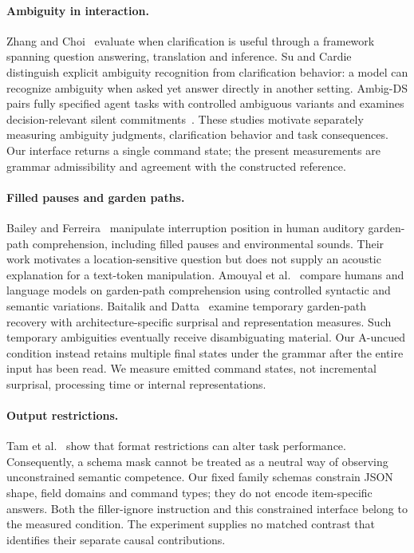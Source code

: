 \documentclass[11pt]{article}
\begin{document}
\paragraph{Ambiguity in interaction.}
Zhang and Choi\ \cite{zhang-choi-2025-clarify} evaluate when clarification is useful through a framework spanning question answering, translation and inference. Su and Cardie\ \cite{su2026knowing} distinguish explicit ambiguity recognition from clarification behavior: a model can recognize ambiguity when asked yet answer directly in another setting. Ambig-DS pairs fully specified agent tasks with controlled ambiguous variants and examines decision-relevant silent commitments\ \cite{stoisser2026ambigds}. These studies motivate separately measuring ambiguity judgments, clarification behavior and task consequences. Our interface returns a single command state; the present measurements are grammar admissibility and agreement with the constructed reference.

\paragraph{Filled pauses and garden paths.}
Bailey and Ferreira\ \cite{Bailey_2003} manipulate interruption position in human auditory garden-path comprehension, including filled pauses and environmental sounds. Their work motivates a location-sensitive question but does not supply an acoustic explanation for a text-token manipulation. Amouyal et al.\ \cite{amouyal-etal-2025-lm} compare humans and language models on garden-path comprehension using controlled syntactic and semantic variations. Baitalik and Datta\ \cite{baitalik-datta-2026-garden} examine temporary garden-path recovery with architecture-specific surprisal and representation measures. Such temporary ambiguities eventually receive disambiguating material. Our A-uncued condition instead retains multiple final states under the grammar after the entire input has been read. We measure emitted command states, not incremental surprisal, processing time or internal representations.

\paragraph{Output restrictions.}
Tam et al.\ \cite{tam-etal-2024-speak} show that format restrictions can alter task performance. Consequently, a schema mask cannot be treated as a neutral way of observing unconstrained semantic competence. Our fixed family schemas constrain JSON shape, field domains and command types; they do not encode item-specific answers. Both the filler-ignore instruction and this constrained interface belong to the measured condition. The experiment supplies no matched contrast that identifies their separate causal contributions.
\end{document}
